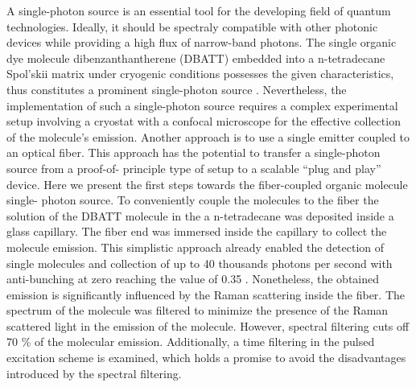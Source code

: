 \documentclass[twocolumn]{article}
\begin{document}
A single-photon source is an essential tool for the developing field of quantum
technologies. Ideally, it should be spectraly compatible with other photonic devices
while providing a high flux of narrow-band photons. The single organic dye molecule
dibenzanthantherene (DBATT) embedded into a n-tetradecane Spol'skii matrix under
cryogenic conditions possesses the given characteristics, thus constitutes a
prominent single-photon source \cite{PRX}. Nevertheless, the implementation of such a
single-photon source requires a complex experimental setup involving a cryostat
with a confocal microscope for the effective collection of the molecule's emission.
Another approach is to use a single emitter coupled to an optical fiber. This
approach has the potential to transfer a single-photon source from a proof-of-
principle type of setup to a scalable “plug and play” device.
Here we present the first steps towards the fiber-coupled organic molecule single-
photon source. To conveniently couple the molecules to the fiber the solution of the
DBATT molecule in the a n-tetradecane was deposited inside a glass capillary. The
fiber end was immersed inside the capillary to collect the molecule emission. This
simplistic approach already enabled the detection of single molecules and collection
of up to 40 thousands photons per second with anti-bunching at zero reaching the
value of 0.35 \cite{PRA}. Nonetheless, the obtained emission is significantly influenced by the
Raman scattering inside the fiber. The spectrum of the molecule was filtered to
minimize the presence of the Raman scattered light in the emission of the molecule.
However, spectral filtering cuts off 70 \% of the molecular emission. Additionally, a
time filtering in the pulsed excitation scheme is examined, which holds a promise to
avoid the disadvantages introduced by the spectral filtering.
 
 
\vspace{0em}


\begin{figure}[h]
\end{figure}
\end{document}
